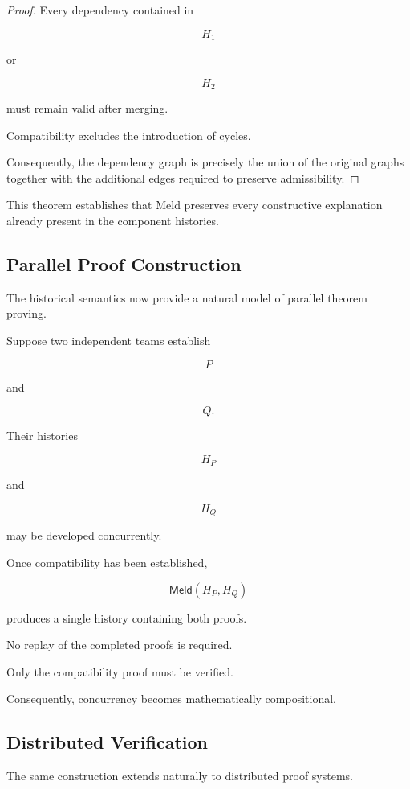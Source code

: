 \documentclass[12pt,oneside]{article}
\theoremstyle{definition}
\theoremstyle{remark}
\newcommand{\Meld}{\mathsf{Meld}}
\begin{document}
\begin{proof}

Every dependency contained in

\[
H_1
\]

or

\[
H_2
\]

must remain valid after merging.

Compatibility excludes the introduction of cycles.

Consequently, the dependency graph is precisely the union of the original graphs
together with the additional edges required to preserve admissibility.

\end{proof}

This theorem establishes that Meld preserves every constructive explanation
already present in the component histories.

\subsection{Parallel Proof Construction}

The historical semantics now provide a natural model of parallel theorem
proving.

Suppose two independent teams establish

\[
P
\]

and

\[
Q.
\]

Their histories

\[
H_P
\]

and

\[
H_Q
\]

may be developed concurrently.

Once compatibility has been established,

\[
\Meld(H_P,H_Q)
\]

produces a single history containing both proofs.

No replay of the completed proofs is required.

Only the compatibility proof must be verified.

Consequently, concurrency becomes mathematically compositional.

\subsection{Distributed Verification}

The same construction extends naturally to distributed proof systems.
\end{document}
